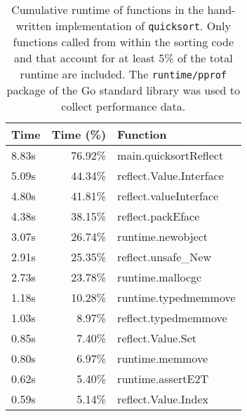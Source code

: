 \documentclass[letterpaper,twocolumn,11pt]{article}
\begin{document}
\begin{table}
\centering
\begin{tabular}{lrl}
Time & Time (\%{}) & Function \\
\hline
8.83s & 76.92\%{} & main.quicksortReflect \\
5.09s & 44.34\%{} & reflect.Value.Interface \\
4.80s & 41.81\%{} & reflect.valueInterface \\
4.38s & 38.15\%{} & reflect.packEface \\
3.07s & 26.74\%{} & runtime.newobject \\
2.91s & 25.35\%{} & reflect.unsafe\_{}New \\
2.73s & 23.78\%{} & runtime.mallocgc \\
1.18s & 10.28\%{} & runtime.typedmemmove \\
1.03s & 8.97\%{} & reflect.typedmemmove \\
0.85s & 7.40\%{} & reflect.Value.Set \\
0.80s & 6.97\%{} & runtime.memmove \\
0.62s & 5.40\%{} & runtime.assertE2T \\
0.59s & 5.14\%{} & reflect.Value.Index \\
\end{tabular}
\begin{comment}
#+ORGTBL: SEND sort_reflect_profile orgtbl-to-latex :splice nil :skip 0
| Time  | Time (%
|-------+----------+-------------------------|
| 8.83s |   76.92%
| 5.09s |   44.34%
| 4.80s |   41.81%
| 4.38s |   38.15%
| 3.07s |   26.74%
| 2.91s |   25.35%
| 2.73s |   23.78%
| 1.18s |   10.28%
| 1.03s |    8.97%
| 0.85s |    7.40%
| 0.80s |    6.97%
| 0.62s |    5.40%
| 0.59s |    5.14%
\end{comment}
\caption{Cumulative runtime of functions in the hand-written implementation of \texttt{quicksort}. Only functions called from within the sorting code and that account for at least 5\% of the total runtime are included. The \texttt{runtime/pprof} package of the Go standard library was used to collect performance data.}\label{tab:reflect_profile}
\end{table}
\end{document}

